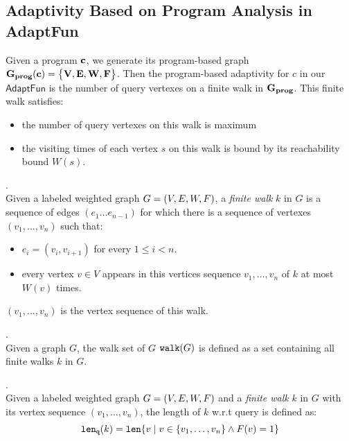 \documentclass[a4paper,11pt]{article}
\newcommand{\THESYSTEM}{\textsf{AdaptFun}}
\begin{document}
\subsection{Adaptivity Based on Program Analysis in \THESYSTEM}
Given a program $\mathbf{{c}}$, we generate its program-based graph 
$\bf{G_{prog}}(\mathbf{{c}}) = \big\{ V, E, W, F \big\}$.
%
Then the program-based adaptivity for $c$ in our $\THESYSTEM$ is the number of query vertexes on a finite walk in $\bf{G_{prog}}$. This finite walk satisfies:
\begin{itemize}
\item the number of query vertexes on this walk is maximum
\item the visiting times of each vertex $s$ on this walk is bound by its reachability bound $W(s)$.
\end{itemize}

\begin{defn}.
\\
Given a labeled weighted graph $G=(V,E,W,F )$, a \emph{finite walk} $k$ in $G$ is a sequence of edges $(e_1 \ldots e_{n - 1})$ 
for which there is a sequence of vertexes $(v_1, \ldots, v_{n})$ such that:
\begin{itemize}
    \item $e_i = (v_{i},v_{i + 1})$ for every $1 \leq i < n$.
    \item every vertex $v \in V$ appears in this vertices sequence $v_1, \ldots, v_{n}$ of $k$ at most $W(v)$ times.  
\end{itemize}
$(v_1, \ldots, v_{n})$ is the vertex sequence of this walk.
\end{defn}

\begin{defn}.
\\
Given a graph $G$, the walk set of $G$ $\mathtt{walk}(G)$ is defined as a set containing all finite walks $k$ in $G$.
\end{defn}
%
%
\begin{defn}.
\\
Given a labeled weighted graph $G=(V,E,W,F )$ and a \emph{finite walk} $k$ in $G$ with its vertex sequence $(v_1, \ldots, v_{n})$, the length of $k$ w.r.t query is defined as:
\[
	\mathtt{len}_{\tt q}(k) = \mathtt{len}\{ v \mid v \in \{v_1, \ldots, v_{n}\} \land F(v) = 1 \}
\]
\end{defn}
\end{document}
